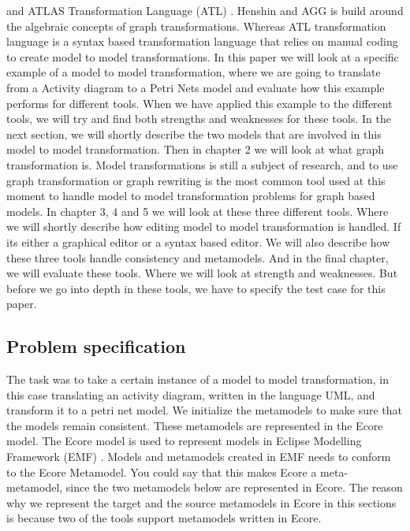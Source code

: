 \documentclass[pdftex,11pt,a4paper]{article}
\begin{document}
\cite{AGG} and ATLAS Transformation Language (ATL) \cite{ATL}. Henshin and AGG
is build around the algebraic concepts of graph transformations. Whereas ATL
transformation language is a syntax based transformation language that relies
on manual coding to create model to model transformations. In this paper we
will look at a specific example of a model to model transformation, where we
are going to translate from a Activity diagram to a Petri Nets model and
evaluate how this example performs for different tools. When we have applied
this example to the different tools, we will try and find both strengths and
weaknesses for these tools. In the next section, we will shortly describe the
two models that are involved in this model to model transformation. Then in
chapter 2 we will look at what graph transformation is. Model transformations
is still a subject of research, and to use graph transformation or graph
rewriting is the most common tool used at this moment to handle model to model
transformation problems for graph based models. In chapter 3, 4 and 5 we will
look at these three different tools. Where we will shortly describe how editing
model to model transformation is handled. If its either a graphical editor or a
syntax based editor. We will also describe how these three tools handle
consistency and metamodels. And in the final chapter, we will evaluate these
tools. Where we will look at strength and weaknesses. But before we go into
depth in these tools, we have to specify the test case for this paper.

\subsection{Problem specification}
\noindent The task was to take a certain instance of a model to model
transformation, in this case translating an activity diagram, written in the
language UML, and transform it to a petri net model. We initialize the
metamodels to make sure that the models remain consistent. These metamodels are
represented in the Ecore model\cite{Steinberg2009}. The Ecore model is used to
represent models in Eclipse Modelling Framework (EMF) \cite{Steinberg2009}.
Models and metamodels created in EMF needs to conform to the Ecore Metamodel.
You could say that this makes Ecore a meta-metamodel, since the two metamodels
below are represented in Ecore. The reason why we represent the target and the
source metamodels in Ecore in this sections is because two of the tools support
metamodels written in Ecore.
\end{document}
